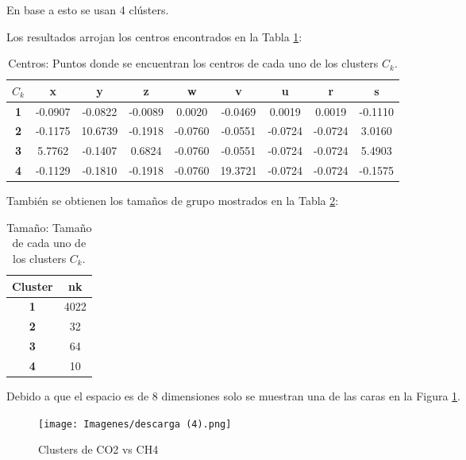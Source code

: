 \documentclass[13.6pt]{article}
\begin{document}
En base a esto se usan 4 clústers.


Los resultados arrojan los centros encontrados en la Tabla \ref{table:tabkcentros}:

\begin{table}[h]\centering
\caption{Centros: Puntos donde se encuentran los centros de cada uno de los clusters $C_k$.}
\label{table:tabkcentros}
\begin{tabular}{ccccccccc}
\hline
\textbf{$C_k$} & \textbf{x} & \textbf{y} & \textbf{z} & \textbf{w} & \textbf{v} & \textbf{u} & \textbf{r} & \textbf{s} \\ \hline
\textbf{1}       & -0.0907  & -0.0822  & -0.0089  & 0.0020   & -0.0469  & 0.0019   & 0.0019   & -0.1110  \\
\textbf{2}       & -0.1175  & 10.6739  & -0.1918  & -0.0760  & -0.0551  & -0.0724  & -0.0724  & 3.0160   \\
\textbf{3}       & 5.7762   & -0.1407  & 0.6824   & -0.0760  & -0.0551  & -0.0724  & -0.0724  & 5.4903   \\
\textbf{4}       & -0.1129  & -0.1810  & -0.1918  & -0.0760  & 19.3721  & -0.0724  & -0.0724  & -0.1575  \\ \hline
\end{tabular}
\end{table}

También se obtienen los tamaños de grupo mostrados en la Tabla \ref{table: noelementos}:

\begin{table}[h]\centering
\caption{Tamaño: Tamaño de cada uno de los clusters $C_k$.}

\begin{tabular}{cc}
\hline
\textbf{Cluster} & \textbf{nk} \\ \hline
\textbf{1}       & 4022        \\
\textbf{2}       & 32          \\
\textbf{3}       & 64          \\
\textbf{4}       & 10          \\ \hline
\end{tabular}
\label{table: noelementos}
\end{table}

Debido a que el espacio es de 8 dimensiones solo se muestran una de las caras en la Figura \ref{fig: CO2VCH4}.

\begin{figure}
\texttt{[image: Imagenes/descarga (4).png]}
\caption{Clusters de CO2 vs CH4}
\label{fig: CO2VCH4}
\end{figure}
\end{document}
